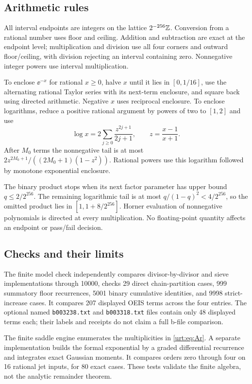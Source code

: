 \documentclass[11pt,letterpaper]{article}
\theoremstyle{remark}\newtheorem{remark}[theorem]{Remark}
\begin{document}
\subsection{Arithmetic rules}
All interval endpoints are integers on the lattice $2^{-256}\mathbb Z$. Conversion from a rational number uses floor and ceiling. Addition and subtraction are exact at the endpoint level; multiplication and division use all four corners and outward floor/ceiling, with division rejecting an interval containing zero. Nonnegative integer powers use interval multiplication.

To enclose $\ee^{-x}$ for rational $x\ge0$, halve $x$ until it lies in $[0,1/16]$, use the alternating rational Taylor series with its next-term enclosure, and square back using directed arithmetic. Negative $x$ uses reciprocal enclosure. To enclose logarithms, reduce a positive rational argument by powers of two to $[1,2]$ and use
\[
 \log x=2\sum_{j\ge0}\frac{z^{2j+1}}{2j+1},\qquad z=\frac{x-1}{x+1}.
\]
After $M_0$ terms the nonnegative tail is at most $2z^{2M_0+1}/((2M_0+1)(1-z^2))$. Rational powers use this logarithm followed by monotone exponential enclosure.

The binary product stops when its next factor parameter has upper bound $q\le2/2^{256}$. The remaining logarithmic tail is at most $q/(1-q)^2<4/2^{256}$, so the omitted product lies in $[1,1+8/2^{256}]$. Horner evaluation of nonnegative polynomials is directed at every multiplication. No floating-point quantity affects an endpoint or pass/fail decision.

\subsection{Checks and their limits}
The finite model check independently compares divisor-by-divisor and sieve implementations through 10000, checks 29 direct chain-partition cases, 999 summatory floor recurrences, 5001 binary cumulative identities, and 9998 strict-increase cases. It compares 207 displayed OEIS terms across the four entries. The optional named \texttt{b003238.txt} and \texttt{b003318.txt} files contain only 48 displayed terms each; their labels and receipts do not claim a full b-file comparison.

The finite saddle engine enumerates the multiplicities in \eqref{urt:eq:Ar}. A separate implementation builds the formal exponential by a graded differential recurrence and integrates exact Gaussian moments. It compares orders zero through four on 16 rational jet inputs, for 80 exact cases. These tests validate the finite algebra, not the analytic remainder theorem.
\end{document}
